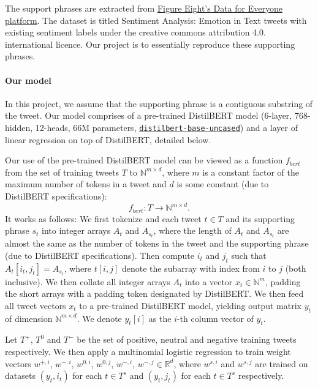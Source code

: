 The support phrases are extracted from \href{https://appen.com/resources/datasets/}{Figure Eight's Data for Everyone platform}. The dataset is titled Sentiment Analysis: Emotion in Text tweets with existing sentiment labels under the creative commons attribution 4.0. international licence. Our project is to essentially reproduce these supporting phrases.



\paragraph{Our model}

In this project, we assume that the supporting phrase is a contiguous
substring of the tweet. Our model comprises of a pre-trained DistilBERT
model (6-layer, 768-hidden, 12-heads, 66M parameters, \href{https://huggingface.co/transformers/pretrained_models.html}{\texttt{distilbert-base-uncased}}) and a layer of linear regression on top of DistilBERT, detailed below. 

Our use of the pre-trained DistilBERT model can be viewed as a function $f_{bert}$ from the set of training tweets $T$ to $\mathbb{N}^{m \times d}$, where $m$ is a constant factor of the maximum number of tokens in a tweet and $d$ is some constant (due to DistilBERT specifications): $$f_{bert}: T \rightarrow \mathbb{N}^{m \times d}.$$ It works as follows: We first tokenize and each tweet $t \in T$ and its supporting phrase $s_t$ into integer arrays $A_t$ and $A_{s_t}$, where the length of $A_t$ and $A_{s_t}$ are almost the same as the number of tokens in the tweet and the supporting phrase (due to DistilBERT specifications). Then compute $i_{t}$ and $j_{t}$ such that $A_t[i_{t}, j_{t}] = A_{s_t}$, where $t[i,j]$ denote the subarray with index from $i$ to $j$ (both inclusive). We then collate all integer arrays $A_t$ into a vector  $x_t \in \mathbb{N}^{m}$, padding the short arrays with a padding token designated by DistilBERT. We then feed all tweet vectors $x_t$ to a pre-trained DistilBERT model, yielding output matrix $y_t$ of dimension $\mathbb{N}^{m \times d}$. We denote $y_t[i]$ as the $i$-th column vector of $y_t$.

Let $T^+$, $T^0$ and $T^-$ be the set of positive, neutral and negative training tweets respectively. We then apply a multinomial logistic regression to train weight vectors $w^{+,i}$, $w^{-,i}$, $w^{0,i}$, $w^{0,j}$, $w^{-,i}$, $w^{-,j} \in \mathbb{R}^d$, where $w^{s,i}$ and $w^{s, j}$ are trained on datasets $(y_{t}, i_t)$ for each $t \in T^s$ and $(y_{t}, j_t)$ for each $t \in T^s$ respectively.


